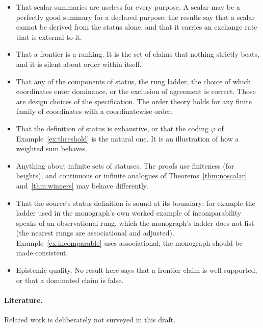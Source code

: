 \documentclass[11pt]{article}
\theoremstyle{plain}
\theoremstyle{definition}
\theoremstyle{remark}
\begin{document}
\begin{itemize}[nosep]
\item That scalar summaries are useless for every purpose. A scalar may be a perfectly good summary for a declared purpose; the results say that a scalar cannot be derived from the status alone, and that it carries an exchange rate that is external to it.
\item That a frontier is a ranking. It is the set of claims that nothing strictly beats, and it is silent about order within itself.
\item That any of the components of status, the rung ladder, the choice of which coordinates enter dominance, or the exclusion of agreement is correct. Those are design choices of the specification. The order theory holds for any finite family of coordinates with a coordinatewise order.
\item That the definition of status is exhaustive, or that the coding $\varphi$ of Example~\ref{ex:threshold} is the natural one. It is an illustration of how a weighted sum behaves.
\item Anything about infinite sets of statuses. The proofs use finiteness (for heights), and continuous or infinite analogues of Theorems~\ref{thm:noscalar} and~\ref{thm:winners} may behave differently.
\item That the source's status definition is sound at its boundary: for example the ladder used in the monograph's own worked example of incomparability speaks of an \textsf{observational} rung, which the monograph's ladder does not list (the nearest rungs are \textsf{associational} and \textsf{adjusted}). Example~\ref{ex:incomparable} uses \textsf{associational}; the monograph should be made consistent.
\item Epistemic quality. No result here says that a frontier claim is well supported, or that a dominated claim is false.
\end{itemize}

\paragraph{Literature.} Related work is deliberately not surveyed in this draft.
\end{document}
